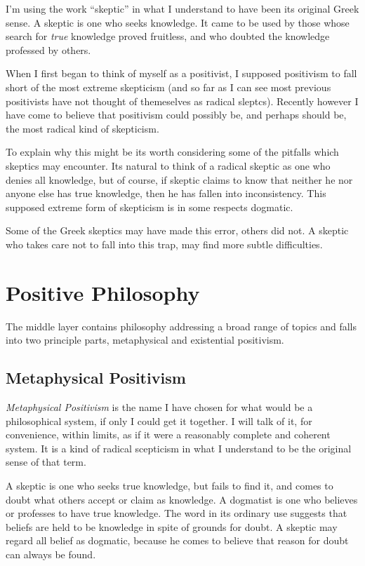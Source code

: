 \documentclass{rbjk}
\begin{document}
\begin{article}
I'm using the work ``skeptic'' in what I understand to have been its original Greek sense.
A skeptic is one who seeks knowledge.
It came to be used by those whose search for {\it true} knowledge proved fruitless, and who doubted the knowledge professed by others.

When I first began to think of myself as a positivist, I supposed positivism to fall short of the most extreme skepticism (and so far as I can see most previous positivists have not thought of themeselves as radical sleptcs).
Recently however I have come to believe that positivism could possibly be, and perhaps should be, the most radical kind of skepticism.

To explain why this might be its worth considering some of the pitfalls which skeptics may encounter.
Its natural to think of a radical skeptic as one who denies all knowledge, but of course, if skeptic claims to know that neither he nor anyone else has true knowledge, then he has fallen into inconsistency.
This supposed extreme form of skepticism is in some respects dogmatic.

Some of the Greek skeptics may have made this error, others did not.
A skeptic who takes care not to fall into this trap, may find more subtle difficulties.

\section{Positive Philosophy}

The middle layer contains philosophy addressing a broad range of topics and falls into two principle parts, metaphysical and existential positivism.

\subsection{Metaphysical Positivism}

{\it Metaphysical Positivism} is the name I have chosen for what would be a philosophical system, if only I could get it together.
I will talk of it, for convenience, within limits, as if it were a reasonably complete and coherent system.
It is a kind of radical scepticism in what I understand to be the original sense of that term.

A skeptic is one who seeks true knowledge, but fails to find it, and comes to doubt what others accept or claim as knowledge.
A dogmatist is one who believes or professes to have true knowledge.
The word in its ordinary use suggests that beliefs are held to be knowledge in spite of grounds for doubt.
A skeptic may regard all belief as dogmatic, because he comes to believe that reason for doubt can always be found.


\end{article}
\end{document}
